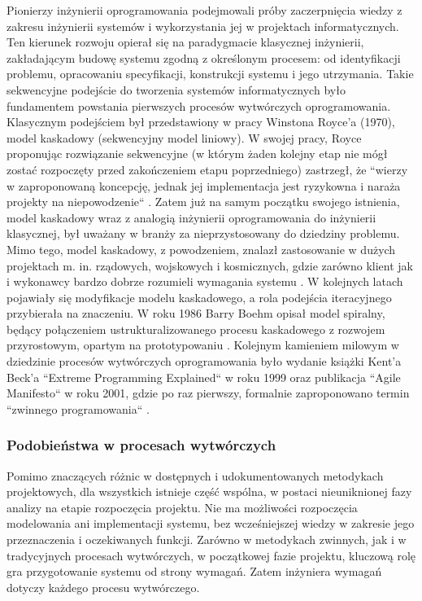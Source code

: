         Pionierzy inżynierii oprogramowania podejmowali próby zaczerpnięcia wiedzy z zakresu inżynierii systemów i wykorzystania jej w projektach informatycznych. Ten kierunek rozwoju opierał się na paradygmacie klasycznej inżynierii, zakładającym budowę systemu zgodną z określonym procesem: od identyfikacji problemu, opracowaniu specyfikacji, konstrukcji systemu i jego utrzymania. Takie sekwencyjne podejście do tworzenia systemów informatycznych było fundamentem powstania pierwszych procesów wytwórczych oprogramowania. Klasycznym podejściem był przedstawiony w pracy Winstona Royce'a (1970), model kaskadowy (sekwencyjny model liniowy)\footnotemark.  W swojej pracy, Royce proponując rozwiązanie sekwencyjne (w którym żaden kolejny etap nie mógł zostać rozpoczęty przed zakończeniem etapu poprzedniego) zastrzegł, że ``wierzy w zaproponowaną koncepcję, jednak jej implementacja jest ryzykowna i naraża projekty na niepowodzenie`` \cite{RWins70}. Zatem już na samym początku swojego istnienia, model kaskadowy wraz z analogią inżynierii oprogramowania do inżynierii klasycznej, był uważany w branży za nieprzystosowany do dziedziny problemu. Mimo tego, model kaskadowy, z powodzeniem, znalazł zastosowanie w dużych projektach m. in. rządowych, wojskowych i kosmicznych, gdzie zarówno klient jak i wykonawcy bardzo dobrze rozumieli wymagania systemu \cite{NasaSE}. W kolejnych latach pojawiały się modyfikacje modelu kaskadowego, a rola podejścia iteracyjnego przybierała na znaczeniu. W roku 1986 Barry Boehm opisał model spiralny, będący połączeniem ustrukturalizowanego procesu kaskadowego z rozwojem przyrostowym, opartym na prototypowaniu \cite{Boehm86}. Kolejnym kamieniem milowym w dziedzinie procesów wytwórczych oprogramowania było wydanie książki Kent'a Beck'a ``Extreme Programming Explained`` \cite{KBeck00} w roku 1999 oraz publikacja ``Agile Manifesto`` w roku 2001, gdzie po raz pierwszy, formalnie zaproponowano termin ``zwinnego programowania`` \cite{MFowl01}. 
      
      \subsubsection{Podobieństwa w procesach wytwórczych}

        Pomimo znaczących różnic w dostępnych i udokumentowanych metodykach projektowych, dla wszystkich istnieje część wspólna, w postaci nieuniknionej fazy analizy na etapie rozpoczęcia projektu. Nie ma możliwości rozpoczęcia modelowania ani implementacji systemu, bez wcześniejszej wiedzy w zakresie jego przeznaczenia i oczekiwanych funkcji. Zarówno w metodykach zwinnych, jak i w tradycyjnych procesach wytwórczych, w początkowej fazie projektu, kluczową rolę gra przygotowanie systemu od strony wymagań. Zatem inżyniera wymagań dotyczy każdego procesu wytwórczego.


